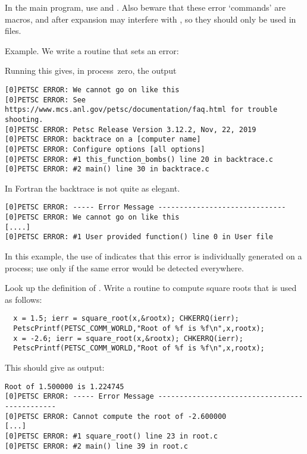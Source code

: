 \begin{fortrannote}
  In the main program, use  and
  . Also beware that these error `commands' are
  macros, and after expansion may interfere with
  , so they should only be
  used in  files.
\end{fortrannote}

Example. We write a routine that sets an error:

Running this gives, in process~zero, the output
\begin{verbatim}
[0]PETSC ERROR: We cannot go on like this
[0]PETSC ERROR: See https://www.mcs.anl.gov/petsc/documentation/faq.html for trouble shooting.
[0]PETSC ERROR: Petsc Release Version 3.12.2, Nov, 22, 2019
[0]PETSC ERROR: backtrace on a [computer name]
[0]PETSC ERROR: Configure options [all options]
[0]PETSC ERROR: #1 this_function_bombs() line 20 in backtrace.c
[0]PETSC ERROR: #2 main() line 30 in backtrace.c  
\end{verbatim}

\begin{fortrannote}
  In Fortran the backtrace is not quite as elegant.
\begin{verbatim}
[0]PETSC ERROR: ----- Error Message ------------------------------
[0]PETSC ERROR: We cannot go on like this
[....]
[0]PETSC ERROR: #1 User provided function() line 0 in User file
\end{verbatim}
\end{fortrannote}

\begin{remark}
  In this example, the use of  indicates
  that this error is individually generated on a process;
  use  only if the same error would
  be detected everywhere.
\end{remark}

\begin{exercise}
  Look up the definition of .
  Write a routine to compute square roots that is used as follows:
\begin{lstlisting}
  x = 1.5; ierr = square_root(x,&rootx); CHKERRQ(ierr);
  PetscPrintf(PETSC_COMM_WORLD,"Root of %f is %f\n",x,rootx);
  x = -2.6; ierr = square_root(x,&rootx); CHKERRQ(ierr);
  PetscPrintf(PETSC_COMM_WORLD,"Root of %f is %f\n",x,rootx);
\end{lstlisting}
This should give as output:
\begin{verbatim}
Root of 1.500000 is 1.224745
[0]PETSC ERROR: ----- Error Message ----------------------------------------------
[0]PETSC ERROR: Cannot compute the root of -2.600000
[...]
[0]PETSC ERROR: #1 square_root() line 23 in root.c
[0]PETSC ERROR: #2 main() line 39 in root.c
\end{verbatim}

\end{exercise}

